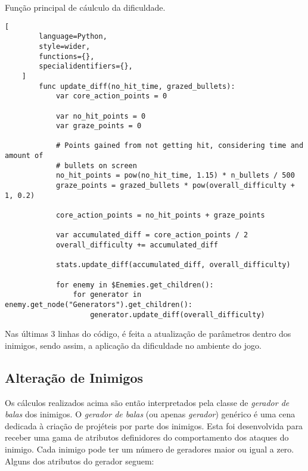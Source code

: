 \begin{programruledcaption}{Função principal de cáulculo da dificuldade\label{prog:diff_calc}.}
    \begin{lstlisting}[
        language=Python,
        style=wider,
        functions={},
        specialidentifiers={},
    ]
        func update_diff(no_hit_time, grazed_bullets):
            var core_action_points = 0
            
            var no_hit_points = 0
            var graze_points = 0
            
            # Points gained from not getting hit, considering time and amount of
            # bullets on screen
            no_hit_points = pow(no_hit_time, 1.15) * n_bullets / 500
            graze_points = grazed_bullets * pow(overall_difficulty + 1, 0.2)

            core_action_points = no_hit_points + graze_points
            
            var accumulated_diff = core_action_points / 2
            overall_difficulty += accumulated_diff

            stats.update_diff(accumulated_diff, overall_difficulty)
            
            for enemy in $Enemies.get_children():
                for generator in enemy.get_node("Generators").get_children():
                    generator.update_diff(overall_difficulty)
    \end{lstlisting}
\end{programruledcaption}

Nas últimas 3 linhas do código, é feita a atualização de parâmetros dentro dos inimigos, sendo assim, a aplicação da dificuldade no ambiente do jogo.

\subsection{Alteração de Inimigos}

Os cálculos realizados acima são então interpretados pela classe de \textit{gerador de balas} dos inimigos. O \textit{gerador de balas} (ou apenas \textit{gerador}) genérico é uma cena dedicada à criação de projéteis por parte dos inimigos. Esta foi desenvolvida para receber uma gama de atributos definidores do comportamento dos ataques do inimigo. Cada inimigo pode ter um número de geradores maior ou igual a zero. Alguns dos atributos do gerador seguem:

